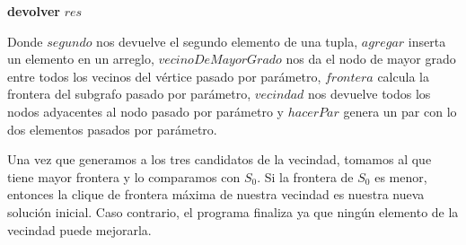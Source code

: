 \begin{itemize}
\begin{algorithm}[H]
    \textbf{devolver} $res$ \\
\end{algorithm}
Donde $segundo$ nos devuelve el segundo elemento de una tupla,  $agregar$ inserta un elemento en un arreglo, $vecinoDeMayorGrado$ nos da el nodo de mayor grado entre todos los vecinos del vértice pasado por parámetro, $frontera$ calcula la frontera del subgrafo pasado por parámetro, $vecindad$ nos devuelve todos los nodos adyacentes al nodo pasado por parámetro y $hacerPar$ genera un par con lo dos elementos pasados por parámetro. \newline
\end{itemize}

Una vez que generamos a los tres candidatos de la vecindad, tomamos al que tiene mayor frontera y lo comparamos con $S_{0}$. Si la frontera de $S_{0}$ es menor, entonces la clique de frontera máxima de nuestra vecindad es nuestra nueva solución inicial. Caso contrario, el programa finaliza ya que ningún elemento de la vecindad puede mejorarla.

